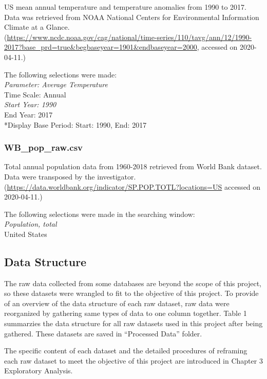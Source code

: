\documentclass[12pt,]{article}
\begin{document}
US mean annual temperature and temperature anomalies from 1990 to 2017.
Data was retrieved from NOAA National Centers for Environmental
Information Climate at a Glance.\\
(\url{https://www.ncdc.noaa.gov/cag/national/time-series/110/tavg/ann/12/1990-2017?base_prd=true\&begbaseyear=1901\&endbaseyear=2000},
accessed on 2020-04-11.)

The following selections were made:\\
\emph{Parameter: Average Temperature\\
}Time Scale: Annual\\
\emph{Start Year: 1990\\
}End Year: 2017\\
*Display Base Period: Start: 1990, End: 2017

\subsubsection{WB\_pop\_raw.csv}\label{wb_pop_raw.csv}

Total annual population data from 1960-2018 retrieved from World Bank
dataset. Data were transposed by the investigator.\\
(\url{https://data.worldbank.org/indicator/SP.POP.TOTL?locations=US}
accessed on 2020-04-11.)

The following selections were made in the searching window:\\
\emph{Population, total\\
}United States

\subsection{Data Structure}\label{data-structure}

The raw data collected from some databases are beyond the scope of this
project, so these datasets were wrangled to fit to the objective of this
project. To provide of an overview of the data structure of each raw
dataset, raw data were reorganized by gathering same types of data to
one column together. Table 1 summarzies the data structure for all raw
datasets used in this project after being gathered. These datasets are
saved in ``Processed Data'' folder.

The specific content of each dataset and the detailed procedures of
reframing each raw dataset to meet the objective of this project are
introduced in Chapter 3 Exploratory Analysis.
\end{document}
